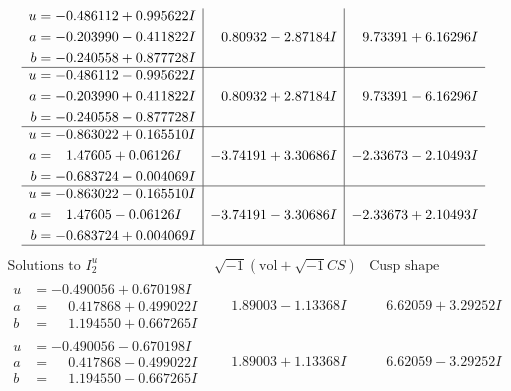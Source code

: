 \documentclass[1p]{elsarticle_modified}
\theoremstyle{definition}
\newcommand{\I}{\sqrt{-1}}
\begin{document}
$$\begin{array}{c|c|c}
\begin{aligned}
u &= -0.486112 + 0.995622 I \\
a &= -0.203990 - 0.411822 I \\
b &= -0.240558 + 0.877728 I\end{aligned}
 & \phantom{-}0.80932 - 2.87184 I & \phantom{-}9.73391 + 6.16296 I \\ \hline\begin{aligned}
u &= -0.486112 - 0.995622 I \\
a &= -0.203990 + 0.411822 I \\
b &= -0.240558 - 0.877728 I\end{aligned}
 & \phantom{-}0.80932 + 2.87184 I & \phantom{-}9.73391 - 6.16296 I \\ \hline\begin{aligned}
u &= -0.863022 + 0.165510 I \\
a &= \phantom{-}1.47605 + 0.06126 I \\
b &= -0.683724 - 0.004069 I\end{aligned}
 & -3.74191 + 3.30686 I & -2.33673 - 2.10493 I \\ \hline\begin{aligned}
u &= -0.863022 - 0.165510 I \\
a &= \phantom{-}1.47605 - 0.06126 I \\
b &= -0.683724 + 0.004069 I\end{aligned}
 & -3.74191 - 3.30686 I & -2.33673 + 2.10493 I\\
 \hline 
 \end{array}$$\newpage$$\begin{array}{c|c|c}  
\text{Solutions to }I^u_{2}& \I (\text{vol} + \sqrt{-1}CS) & \text{Cusp shape}\\
 \hline 
\begin{aligned}
u &= -0.490056 + 0.670198 I \\
a &= \phantom{-}0.417868 + 0.499022 I \\
b &= \phantom{-}1.194550 + 0.667265 I\end{aligned}
 & \phantom{-}1.89003 - 1.13368 I & \phantom{-}6.62059 + 3.29252 I \\ \hline\begin{aligned}
u &= -0.490056 - 0.670198 I \\
a &= \phantom{-}0.417868 - 0.499022 I \\
b &= \phantom{-}1.194550 - 0.667265 I\end{aligned}
 & \phantom{-}1.89003 + 1.13368 I & \phantom{-}6.62059 - 3.29252 I \\ \hline\begin{aligned}

\end{aligned}
\end{array}$$
\end{document}
